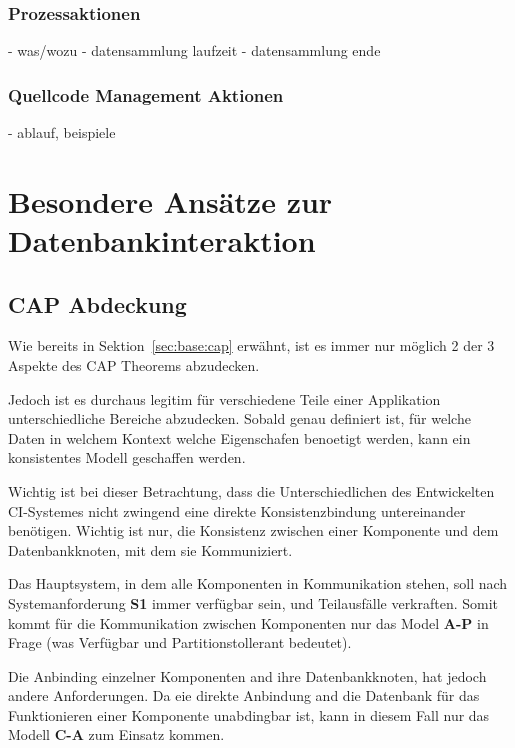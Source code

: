 \FloatBarrier
\subsubsection{Prozessaktionen}

- was/wozu
- datensammlung laufzeit
- datensammlung ende

\subsubsection{Quellcode Management Aktionen}

- ablauf, beispiele



\section{Besondere Ans\"atze zur Datenbankinteraktion}



\subsection{CAP Abdeckung}

Wie bereits in Sektion~\ref{sec:base:cap} erw\"ahnt,
ist es immer nur m\"oglich 2 der 3 Aspekte des CAP Theorems abzudecken.

Jedoch ist es durchaus legitim f\"ur verschiedene Teile einer Applikation unterschiedliche Bereiche abzudecken.
Sobald genau definiert ist, f\"ur welche Daten in welchem Kontext welche Eigenschafen benoetigt werden,
kann ein konsistentes Modell geschaffen werden.

Wichtig ist bei dieser Betrachtung, dass die Unterschiedlichen des Entwickelten CI-Systemes
nicht zwingend eine direkte Konsistenzbindung untereinander ben\"otigen.
Wichtig ist nur, die Konsistenz zwischen einer Komponente und dem Datenbankknoten,
mit dem sie Kommuniziert.

Das Hauptsystem, in dem alle Komponenten in Kommunikation stehen,
soll nach Systemanforderung \textbf{S1} immer verf\"ugbar sein, und Teilausf\"alle verkraften.
Somit kommt f\"ur die Kommunikation zwischen Komponenten nur das Model \textbf{A-P} in Frage
(was Verf\"ugbar und Partitionstollerant bedeutet).

Die Anbinding einzelner Komponenten and ihre Datenbankknoten, hat jedoch andere Anforderungen.
Da eie direkte Anbindung and die Datenbank f\"ur das Funktionieren einer Komponente unabdingbar ist,
kann in diesem Fall nur das Modell \textbf{C-A} zum Einsatz kommen.


